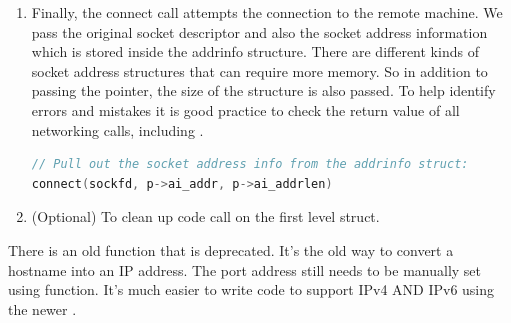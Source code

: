 \begin{enumerate}
Sockets are created with a domain  for  or  for ,  is whether to use UDP, TCP, or some other socket type, the  is an optional choice of protocol configuration; for our examples we can leave this as 0 for default.
This call creates a socket object in the kernel with which one can communicate with the outside world/network.
You can use the result of  to fill in the  parameters, or provide them manually.

The socket call returns an integer - a file descriptor - and, for TCP clients, you can use it as a regular file descriptor.
You can use  and  to receive or send packets.

TCP sockets are similar to  and are often used in situations that require IPC.
We don't mention it in the previous chapters because it is overkill using a device suited for networks to simply communicate between processes on a single thread.

\item {}

Finally, the connect call attempts the connection to the remote machine.
We pass the original socket descriptor and also the socket address information which is stored inside the addrinfo structure.
There are different kinds of socket address structures that can require more memory.
So in addition to passing the pointer, the size of the structure is also passed.
To help identify errors and mistakes it is good practice to check the return value of all networking calls, including .


\begin{lstlisting}[language=C]
// Pull out the socket address info from the addrinfo struct:
connect(sockfd, p->ai_addr, p->ai_addrlen)
\end{lstlisting}

\item (Optional) To clean up code call  on the first level  struct.
\end{enumerate}

There is an old function  that is deprecated.
It's the old way to convert a hostname into an IP address.
The port address still needs to be manually set using  function.
It's much easier to write code to support IPv4 AND IPv6 using the newer .

